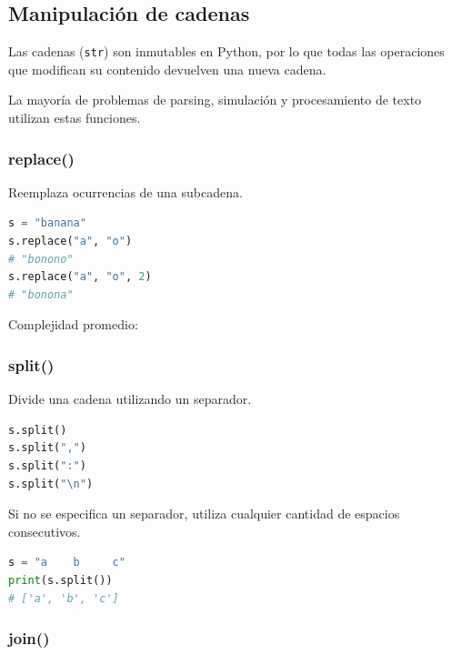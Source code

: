 \subsection{Manipulación de cadenas}
\label{alg:2-4}

Las cadenas (\texttt{str}) son inmutables en Python, por lo que todas las operaciones que modifican su contenido devuelven una nueva cadena.

La mayoría de problemas de parsing, simulación y procesamiento de texto utilizan estas funciones.

\vspace{0.3cm}

\subsubsection{replace()}

Reemplaza ocurrencias de una subcadena.

\begin{lstlisting}[language=Python]
s = "banana"
s.replace("a", "o")
# "bonono"
s.replace("a", "o", 2)
# "bonona"
\end{lstlisting}

Complejidad promedio: 

\vspace{0.3cm}

\subsubsection{split()}

Divide una cadena utilizando un separador.

\begin{lstlisting}[language=Python]
s.split()
s.split(",")
s.split(":")
s.split("\n")
\end{lstlisting}

Si no se especifica un separador, utiliza cualquier cantidad de espacios consecutivos.

\begin{lstlisting}[language=Python]
s = "a    b     c"
print(s.split())
# ['a', 'b', 'c']
\end{lstlisting}

\vspace{0.3cm}

\subsubsection{join()}

